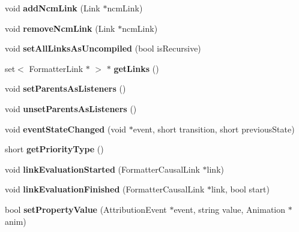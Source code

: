 \begin{CompactItemize}
\item 
void \textbf{addNcmLink} (Link $\ast$ncmLink)\label{classbr_1_1pucrio_1_1telemidia_1_1ginga_1_1ncl_1_1model_1_1components_1_1CompositeExecutionObject_f89556347ec991789545bd9c38c3aa0d}

\item 
void \textbf{removeNcmLink} (Link $\ast$ncmLink)\label{classbr_1_1pucrio_1_1telemidia_1_1ginga_1_1ncl_1_1model_1_1components_1_1CompositeExecutionObject_b38f47387644ec358ff768aa6c6cb9d6}

\item 
void \textbf{setAllLinksAsUncompiled} (bool isRecursive)\label{classbr_1_1pucrio_1_1telemidia_1_1ginga_1_1ncl_1_1model_1_1components_1_1CompositeExecutionObject_c624474ccd677dd3cc47e6a19ff5ce43}

\item 
set$<$ FormatterLink $\ast$ $>$ $\ast$ \textbf{getLinks} ()\label{classbr_1_1pucrio_1_1telemidia_1_1ginga_1_1ncl_1_1model_1_1components_1_1CompositeExecutionObject_ef6e646747ad4be30c20822a43ae90b3}

\item 
void \textbf{setParentsAsListeners} ()\label{classbr_1_1pucrio_1_1telemidia_1_1ginga_1_1ncl_1_1model_1_1components_1_1CompositeExecutionObject_8e4517d1881f5d119c66802baec69003}

\item 
void \textbf{unsetParentsAsListeners} ()\label{classbr_1_1pucrio_1_1telemidia_1_1ginga_1_1ncl_1_1model_1_1components_1_1CompositeExecutionObject_2ae9f89ddf33816fc04b4576e9184ec1}

\item 
void \textbf{eventStateChanged} (void $\ast$event, short transition, short previousState)\label{classbr_1_1pucrio_1_1telemidia_1_1ginga_1_1ncl_1_1model_1_1components_1_1CompositeExecutionObject_db50d000dea7e01eceb25920bbb1e902}

\item 
short \textbf{getPriorityType} ()\label{classbr_1_1pucrio_1_1telemidia_1_1ginga_1_1ncl_1_1model_1_1components_1_1CompositeExecutionObject_ae7d2f7d0ac4466813deee19bbea7ebe}

\item 
void \textbf{linkEvaluationStarted} (FormatterCausalLink $\ast$link)\label{classbr_1_1pucrio_1_1telemidia_1_1ginga_1_1ncl_1_1model_1_1components_1_1CompositeExecutionObject_fd5679361fbcfca493946c09ae54edc7}

\item 
void \textbf{linkEvaluationFinished} (FormatterCausalLink $\ast$link, bool start)\label{classbr_1_1pucrio_1_1telemidia_1_1ginga_1_1ncl_1_1model_1_1components_1_1CompositeExecutionObject_5cbc8d8cefa58a8eafc81e78eada3c4f}

\item 
bool \textbf{setPropertyValue} (AttributionEvent $\ast$event, string value, Animation $\ast$anim)\label{classbr_1_1pucrio_1_1telemidia_1_1ginga_1_1ncl_1_1model_1_1components_1_1CompositeExecutionObject_3e4b84e57de627326fc7bf7c4e129ba5}

\end{CompactItemize}
